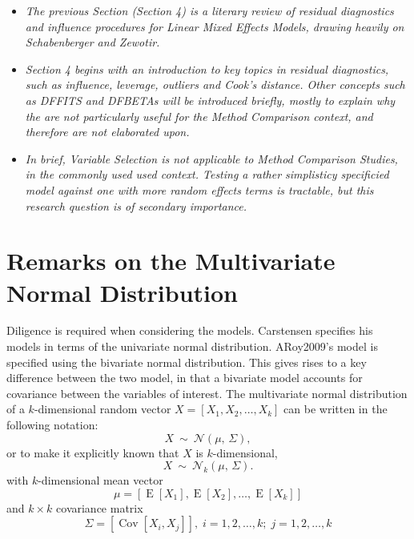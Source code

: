 \documentclass[12pt, a4paper]{report}
\theoremstyle{plain}
\theoremstyle{definition}
\theoremstyle{remark}
\begin{document}

\begin{itemize}
	\item \textit{
		The previous Section (Section 4) is a literary review of residual diagnostics and influence procedures
		for Linear Mixed Effects Models, drawing heavily on Schabenberger and Zewotir.}
	
	\item \textit{	Section 4 begins with an introduction to key topics in residual diagnostics, such as influence, leverage, outliers
		and Cook's distance. Other concepts such as DFFITS and DFBETAs will be introduced briefly, mostly to explain why the are not particularly useful for
		the Method Comparison context, and therefore are not elaborated upon.}
	
	\item \textit{	In brief, Variable Selection is not applicable to Method Comparison Studies, in the 
		commonly used used context. 
		Testing a rather simplisticy specificied model against one with more random effects terms is tractable, but this research question is of secondary importance.}
\end{itemize}




	\section{Remarks on the Multivariate Normal Distribution}
	
	Diligence is required when considering the models. Carstensen specifies his models in terms of the univariate normal distribution. ARoy2009's model is specified using the bivariate normal distribution.
	This gives rises to a key difference between the two model, in that a bivariate model accounts for covariance between the variables of interest.
	The multivariate normal distribution of a $k$-dimensional random vector $X = [X_1, X_2, \ldots, X_k]$
	can be written in the following notation:
	\[
	X\ \sim\ \mathcal{N}(\mu,\, \Sigma),
	\]
	or to make it explicitly known that $X$ is $k$-dimensional,
	\[
	X\ \sim\ \mathcal{N}_k(\mu,\, \Sigma).
	\]
	with $k$-dimensional mean vector
	\[ \mu = [ \operatorname{E}[X_1], \operatorname{E}[X_2], \ldots, \operatorname{E}[X_k]] \]
	and $k \times k$ covariance matrix
	\[ \Sigma = [\operatorname{Cov}[X_i, X_j]], \; i=1,2,\ldots,k; \; j=1,2,\ldots,k \]
	
	\bigskip
	
\end{document}

